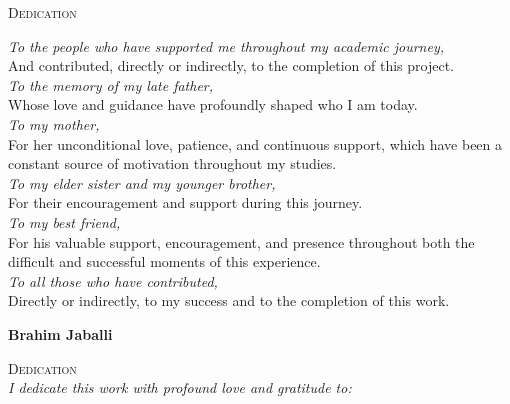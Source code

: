\thispagestyle{empty}
\vspace*{2cm}
\begin{center}
    \textsc{\Large Dedication}\\[1.2cm]
\end{center}

\vspace{0.8cm}
\begin{flushleft}
    \large
    \textit{To the people who have supported me throughout my academic journey,}\\
    And contributed, directly or indirectly, to the completion of this project.\\
    \vspace{0.5cm}
    \textit{To the memory of my late father,}\\
    Whose love and guidance have profoundly shaped who I am today.\\
    \vspace{0.5cm}
    \textit{To my mother,}\\
    For her unconditional love, patience, and continuous support, which have been a constant source of motivation throughout my studies.\\
    \vspace{0.5cm}
    \textit{To my elder sister and my younger brother,}\\
    For their encouragement and support during this journey.\\
    \vspace{0.5cm}
    \textit{To my best friend,}\\
    For his valuable support, encouragement, and presence throughout both the difficult and successful moments of this experience.\\
    \vspace{0.5cm}
    \textit{To all those who have contributed,}\\
    Directly or indirectly, to my success and to the completion of this work.\\
\end{flushleft}

\vspace{1.5cm}
\begin{flushleft}
    \textbf{Brahim Jaballi}
\end{flushleft}

\newpage


\thispagestyle{empty}
\vspace*{2cm}
\begin{center}
    \textsc{\Large Dedication}\\[1.2cm]
    \large\textit{I dedicate this work with profound love and gratitude to:}
\end{center}

